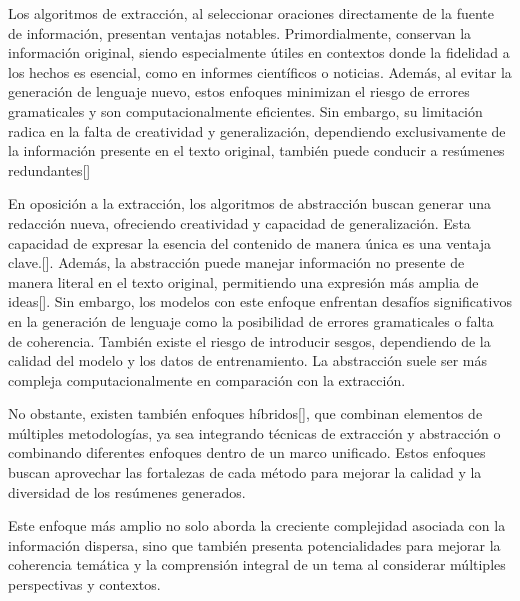     Los algoritmos de extracción, al seleccionar oraciones directamente de la fuente de información, presentan ventajas notables. Primordialmente, conservan la información original, siendo especialmente útiles en contextos donde la fidelidad a los hechos es esencial, como en informes científicos o noticias. Además, al evitar la generación de lenguaje nuevo, estos enfoques minimizan el riesgo de errores gramaticales y son computacionalmente eficientes. Sin embargo, su limitación radica en la falta de creatividad y generalización, dependiendo exclusivamente de la información presente en el texto original, también puede conducir a resúmenes redundantes[\cite{LexRank}]

    En oposición a la extracción, los algoritmos de abstracción buscan generar una redacción nueva, ofreciendo creatividad y capacidad de generalización. Esta capacidad de expresar la esencia del contenido de manera única es una ventaja clave.[\cite{rush2015neural}]. Además, la abstracción puede manejar información no presente de manera literal en el texto original, permitiendo una expresión más amplia de ideas[\cite{PaulusXS17}]. Sin embargo, los modelos con este enfoque enfrentan desafíos significativos en la generación de lenguaje como la posibilidad de errores gramaticales o falta de coherencia. También existe el riesgo de introducir sesgos, dependiendo de la calidad del modelo y los datos de entrenamiento. La abstracción suele ser más compleja computacionalmente en comparación con la extracción.

    No obstante, existen también enfoques híbridos[\cite{SeeLM17}], que combinan elementos de múltiples metodologías, ya sea integrando técnicas de extracción y abstracción o combinando diferentes enfoques dentro de un marco unificado. Estos enfoques buscan aprovechar las fortalezas de cada método para mejorar la calidad y la diversidad de los resúmenes generados.

    Este enfoque más amplio no solo aborda la creciente complejidad asociada con la información dispersa, sino que también presenta potencialidades para mejorar la coherencia temática y la comprensión integral de un tema al considerar múltiples perspectivas y contextos.


